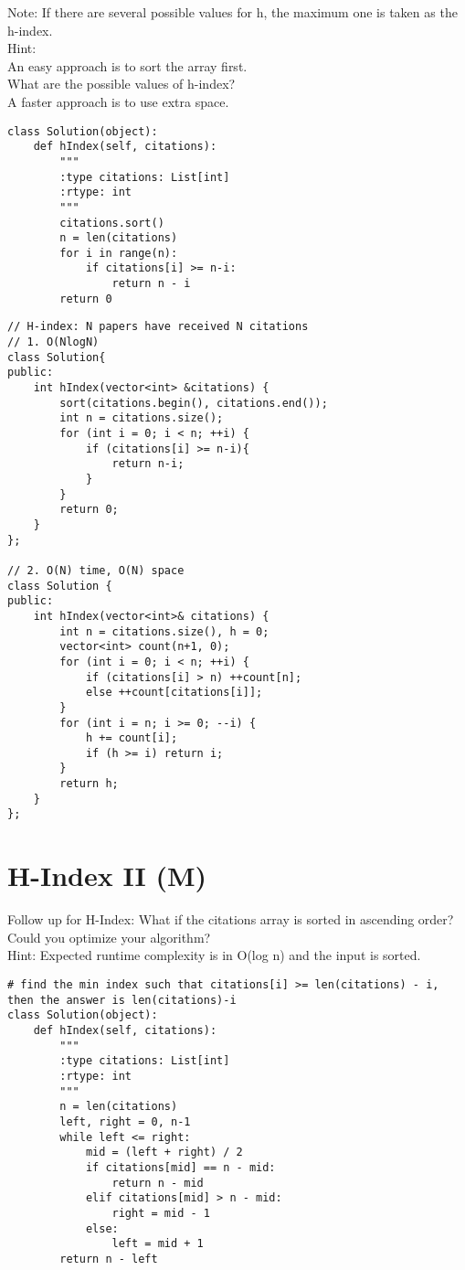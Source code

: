 Note: If there are several possible values for h, the maximum one is taken as the h-index.\\

Hint:\\
    An easy approach is to sort the array first.\\
    What are the possible values of h-index?\\
    A faster approach is to use extra space.\\

\begin{lstlisting}
class Solution(object):
    def hIndex(self, citations):
        """
        :type citations: List[int]
        :rtype: int
        """
        citations.sort()
        n = len(citations)
        for i in range(n):
            if citations[i] >= n-i:
                return n - i
        return 0
\end{lstlisting}


\begin{lstlisting}
// H-index: N papers have received N citations
// 1. O(NlogN)
class Solution{
public:    
    int hIndex(vector<int> &citations) {
        sort(citations.begin(), citations.end());
        int n = citations.size();
        for (int i = 0; i < n; ++i) {
            if (citations[i] >= n-i){
                return n-i;    
            } 
        }
        return 0;
    }    
};

// 2. O(N) time, O(N) space
class Solution {
public:
    int hIndex(vector<int>& citations) {
        int n = citations.size(), h = 0;
        vector<int> count(n+1, 0);
        for (int i = 0; i < n; ++i) {
            if (citations[i] > n) ++count[n];
            else ++count[citations[i]];
        }
        for (int i = n; i >= 0; --i) {
            h += count[i];
            if (h >= i) return i;
        }
        return h;
    }
};
\end{lstlisting}


\section{H-Index II (M)}
Follow up for H-Index: What if the citations array is sorted in ascending order? Could you optimize your algorithm? \\

Hint: Expected runtime complexity is in O(log n) and the input is sorted.\\

\begin{lstlisting}
# find the min index such that citations[i] >= len(citations) - i, then the answer is len(citations)-i
class Solution(object):
    def hIndex(self, citations):
        """
        :type citations: List[int]
        :rtype: int
        """
        n = len(citations)
        left, right = 0, n-1
        while left <= right:
            mid = (left + right) / 2
            if citations[mid] == n - mid:
                return n - mid
            elif citations[mid] > n - mid:
                right = mid - 1
            else:
                left = mid + 1
        return n - left
\end{lstlisting}


